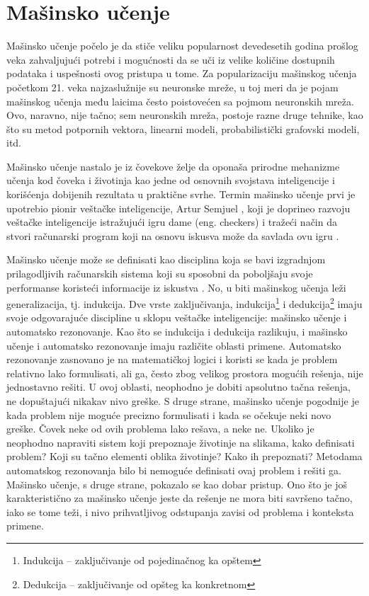 \chapter{Mašinsko učenje}
\label{ch:ml}
Mašinsko učenje počelo je da stiče veliku popularnost devedesetih godina prošlog veka zahvaljujući potrebi i mogućnosti da se uči iz velike količine dostupnih podataka i uspešnosti ovog pristupa u tome. Za popularizaciju mašinskog učenja početkom 21. veka najzaslužnije su neuronske mreže, u toj meri da je pojam mašinskog učenja među laicima često poistovećen sa pojmom neuronskih mreža. Ovo, naravno, nije tačno; sem neuronskih mreža, postoje razne druge tehnike, kao što su metod potpornih vektora, linearni modeli, probabilistički grafovski modeli, itd. \par

Mašinsko učenje nastalo je iz čovekove želje da oponaša prirodne mehanizme učenja kod čoveka i životinja kao jedne od osnovnih svojstava inteligencije i korišćenja dobijenih rezultata u praktične svrhe. Termin mašinsko učenje prvi je upotrebio pionir veštačke inteligencije, Artur Semjuel \cite{samuel_ai}, koji je doprineo razvoju veštačke inteligencije istražujući igru dame (eng. checkers) i tražeći način da stvori računarski program koji na osnovu iskusva može da savlada ovu igru \cite{samuel}. 
\par

Mašinsko učenje može se definisati kao disciplina koja se bavi izgradnjom prilagodljivih računarskih sistema koji su sposobni da poboljšaju svoje performanse koristeći informacije iz iskustva \cite{janicic_vi}. No, u biti mašinskog učenja leži generalizacija, tj. indukcija. Dve vrste zaključivanja, indukcija\footnote{Indukcija -- zaključivanje od pojedinačnog ka opštem} i dedukcija\footnote{Dedukcija -- zaključivanje od opšteg ka konkretnom} imaju svoje odgovarajuće discipline u sklopu veštačke inteligencije: mašinsko učenje i automatsko rezonovanje. Kao što se indukcija i dedukcija razlikuju, i mašinsko učenje i automatsko rezonovanje imaju različite oblasti primene. Automatsko rezonovanje zasnovano je na matematičkoj logici i koristi se kada je problem relativno lako formulisati, ali ga, često zbog velikog prostora mogućih rešenja, nije jednostavno rešiti. U ovoj oblasti, neophodno je dobiti apsolutno tačna rešenja, ne dopuštajući nikakav nivo greške.
S druge strane, mašinsko učenje pogodnije je kada problem nije moguće precizno formulisati i kada se očekuje neki novo greške. Čovek neke od ovih problema lako rešava, a neke ne. 
Ukoliko je neophodno napraviti sistem koji prepoznaje životinje na slikama, kako definisati problem? Koji su tačno elementi oblika životinje? Kako ih prepoznati?  Metodama automatskog rezonovanja bilo bi nemoguće definisati ovaj problem i rešiti ga. Mašinsko učenje, s druge strane, pokazalo se kao dobar pristup. Ono što je još karakteristično za mašinsko učenje jeste da rešenje ne mora biti savršeno tačno, iako se tome teži, i nivo prihvatljivog odstupanja zavisi od problema i konteksta primene. \par

